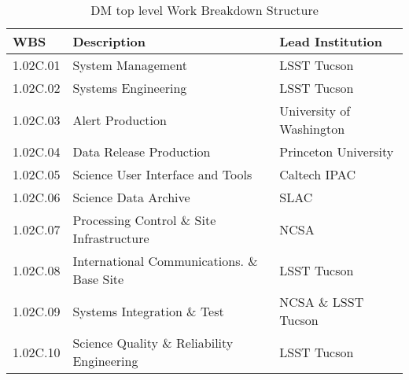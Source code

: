 \begin{table}
\caption{DM top level Work Breakdown Structure \label{tab:wbs}}
\begin{tabular}[htb]{|l|l|l|} \hline
\textbf{WBS}  &  \textbf{Description}   &  \textbf{Lead Institution}\\ \hline
1.02C.01& System Management                       &  LSST Tucson \\ \hline
1.02C.02& Systems Engineering                     &  LSST Tucson \\ \hline
1.02C.03& Alert Production                        &  University of Washington\\ \hline
1.02C.04& Data Release Production                 &  Princeton University\\ \hline
1.02C.05& Science User Interface and Tools        &  Caltech IPAC\\ \hline
1.02C.06& Science Data Archive                    &  SLAC\\ \hline
1.02C.07& Processing Control \& Site Infrastructure & NCSA\\ \hline
1.02C.08& International Communications. \& Base Site&  LSST Tucson \\ \hline
1.02C.09& Systems Integration \& Test               & NCSA \& LSST Tucson \\ \hline
1.02C.10& Science Quality \& Reliability Engineering& LSST Tucson \\ \hline
\end{tabular}
\end{table}
